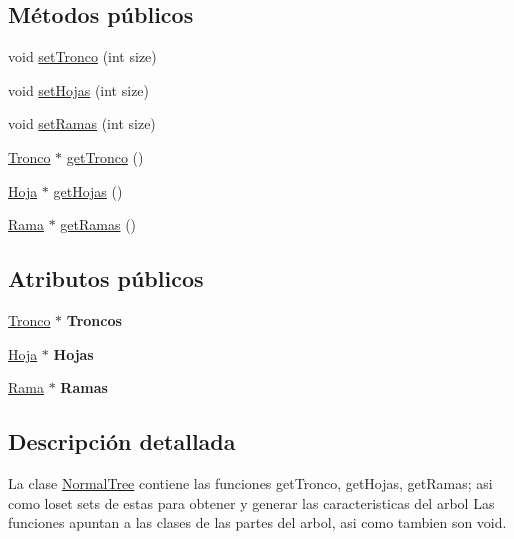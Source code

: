 \subsection*{Métodos públicos}
\begin{DoxyCompactItemize}
\item 
void \hyperlink{classNormalTree_a5b04a8afd8b44a3e2f82479da865f380}{set\+Tronco} (int size)
\item 
void \hyperlink{classNormalTree_a45a0b24a56264362ff1ab0ffa7843f2b}{set\+Hojas} (int size)
\item 
void \hyperlink{classNormalTree_aecf407fc3390d3011effea2f8dea464b}{set\+Ramas} (int size)
\item 
\hyperlink{classTronco}{Tronco} $\ast$ \hyperlink{classNormalTree_a95dcc1035a23a0142ace79e5f994e85a}{get\+Tronco} ()
\item 
\hyperlink{classHoja}{Hoja} $\ast$ \hyperlink{classNormalTree_af856515defde72c7d3350902bfe1cc3e}{get\+Hojas} ()
\item 
\hyperlink{classRama}{Rama} $\ast$ \hyperlink{classNormalTree_ad96708fd66844690669bd9d733b41063}{get\+Ramas} ()
\end{DoxyCompactItemize}
\subsection*{Atributos públicos}
\begin{DoxyCompactItemize}
\item 
\mbox{\label{classNormalTree_a13483e7c3441eeaedb7fd6d5c6737f3b}} 
\hyperlink{classTronco}{Tronco} $\ast$ {\bfseries Troncos}
\item 
\mbox{\label{classNormalTree_aeadff2f44c2e1a2449a92697149aefc1}} 
\hyperlink{classHoja}{Hoja} $\ast$ {\bfseries Hojas}
\item 
\mbox{\label{classNormalTree_a9247184649c047af5f905459539e3c61}} 
\hyperlink{classRama}{Rama} $\ast$ {\bfseries Ramas}
\end{DoxyCompactItemize}


\subsection{Descripción detallada}
La clase \hyperlink{classNormalTree}{Normal\+Tree} contiene las funciones get\+Tronco, get\+Hojas, get\+Ramas; asi como loset sets de estas para obtener y generar las caracteristicas del arbol  Las funciones apuntan a las clases de las partes del arbol, asi como tambien son void. 

